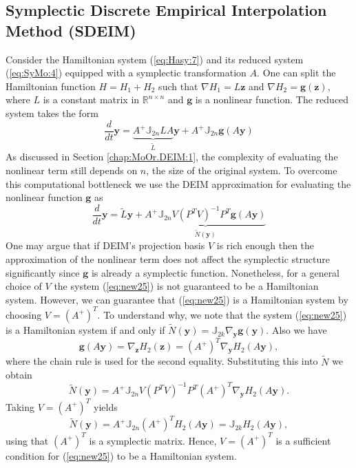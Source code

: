 \subsection{Symplectic Discrete Empirical Interpolation Method (SDEIM)} Consider the Hamiltonian system (\ref{eq:Hasy:7}) and its reduced system (\ref{eq:SyMo:4}) equipped with a symplectic transformation $A$. One can split the Hamiltonian function $H = H_1 + H_2$ such that $\nabla H_1 = L\mathbf z$ and $\nabla H_2 = \mathbf g(\mathbf z)$, where $L$ is a constant matrix in $\mathbb R^{n\times n}$ and $\mathbf g$ is a nonlinear function. The reduced system takes the form
\begin{equation} \label{eq:new24}
	\frac{d}{dt} \mathbf y = \underbrace{A^+ \mathbb J_{2n} L A}_{\tilde L} \mathbf y + A^+ \mathbb J_{2n} \mathbf g(A\mathbf y)
\end{equation}
As discussed in Section \ref{chap:MoOr.DEIM:1}, the complexity of evaluating the nonlinear term still depends on $n$, the size of the original system. To overcome this computational bottleneck we use the DEIM approximation for evaluating the nonlinear function $\mathbf g$ as
\begin{equation} \label{eq:new25}
	\frac{d}{dt} \mathbf y = \tilde L \mathbf y + \underbrace{ A^+ \mathbb J_{2n} V (P^TV)^{-1} P^T \mathbf g(A\mathbf y) }_{\tilde N(\mathbf y)}
\end{equation}
One may argue that if DEIM's projection basis $V$ is rich enough then the approximation of the nonlinear term does not affect the symplectic structure significantly since $\mathbf g$ is already a symplectic function. Nonetheless, for a general choice of $V$ the system (\ref{eq:new25}) is not guaranteed to be a Hamiltonian system. However, we can guarantee that (\ref{eq:new25}) is a Hamiltonian system by choosing $V=(A^+)^T$. To understand why, we note that the system (\ref{eq:new25}) is a Hamiltonian system if and only if $\tilde N(\mathbf y) = \mathbb J_{2k} \nabla_{\mathbf y} \mathbf g(\mathbf y)$. Also we have 
\begin{equation} \label{eq:new26}
	\mathbf g(A\mathbf y) = \nabla_{\mathbf z} H_2(\mathbf z) = (A^+)^T \nabla_{\mathbf y} H_2(A \mathbf y),
\end{equation}
where the chain rule is used for the second equality. Substituting this into $\tilde N$ we obtain
\begin{equation} \label{eq:new27}
	\tilde N(\mathbf y)= A^+ \mathbb J_{2n} V (P^TV)^{-1} P^T  (A^+)^T \nabla_{\mathbf y} H_2(A \mathbf y).
\end{equation}
Taking $V = (A^+)^T$ yields
\begin{equation} \label{eq:new28}
	\tilde N(\mathbf y) = A^+ \mathbb J_{2n}(A^+)^T H_2(A \mathbf y) = \mathbb J_{2k} H_2(A \mathbf y),
\end{equation}
using that $(A^+)^T$ is a symplectic matrix. Hence, $V = (A^+)^T$ is a sufficient condition for (\ref{eq:new25}) to be a Hamiltonian system. 

